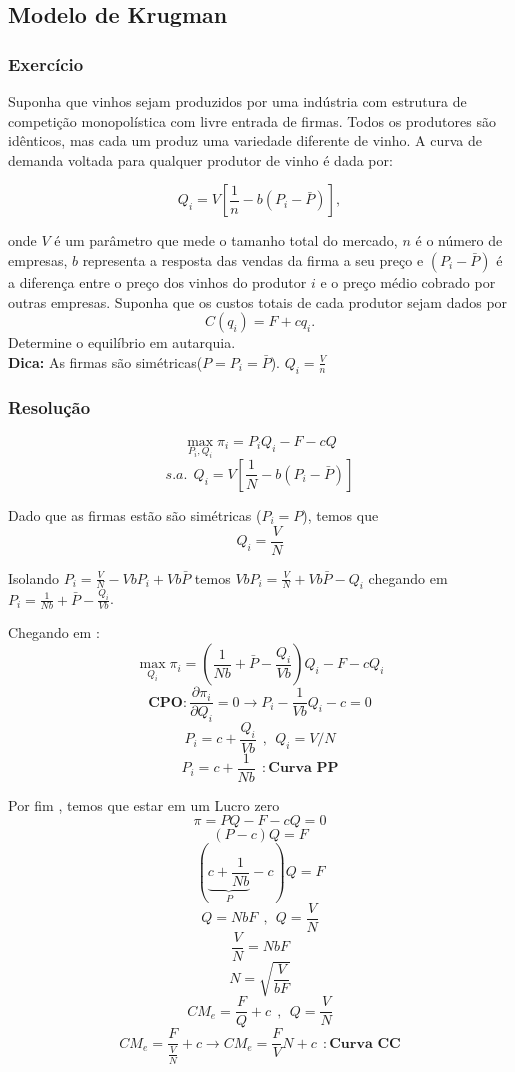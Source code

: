\documentclass[a4paper,12pt]{article}[abntex2]
\begin{document}
\subsection{\textbf{Modelo de Krugman}}
\subsubsection{\textbf{Exercício}}
Suponha que vinhos sejam produzidos por uma indústria com estrutura de  
competição monopolística com livre entrada de firmas. Todos os produtores são  
idênticos, mas cada um produz uma variedade diferente de vinho. A curva de  
demanda voltada para qualquer produtor de vinho é dada por:

\[
Q_i = V \left[ \frac{1}{n} - b(P_i - \bar{P}) \right],
\]

onde \(V\) é um parâmetro que mede o tamanho total do mercado,  
\(n\) é o número de empresas, \(b\) representa a resposta das vendas da firma  
a seu preço e \((P_i - \bar{P})\) é a diferença entre o preço dos vinhos do produtor  
\(i\) e o preço médio cobrado por outras empresas. Suponha que os custos totais  
de cada produtor sejam dados por  
\[
C(q_i) = F + c q_i.
\]  
Determine o equilíbrio em autarquia.\\

\textbf{Dica:} As firmas são simétricas(\(P=P_i=\bar{P}\)).
\(
Q_i=\frac{V}{n}
\)

\subsubsection{\textbf{Resolução}}
\[
\max_{P_i,Q_i}\pi_i=P_iQ_i-F-cQ
\]
\[
s.a. \ \ Q_i=V[\frac{1}{N}-b(P_i-\bar{P})]
\]

Dado que as firmas estão são simétricas (\(P_i=P\)), temos que 
\[
Q_i=\frac{V}{N}
\]

Isolando \(P_i=\frac{V}{N}-VbP_i+Vb\bar{P}\) temos \(VbP_i=\frac{V}{N}+Vb\bar{P}-Q_i\) chegando em \(P_i=\frac{1}{Nb}+\bar{P}-\frac{Q_i}{Vb}\).

Chegando em :
\[
\max_{Q_i} \pi_i=(\frac{1}{Nb}+\bar{P}-\frac{Q_i}{Vb})Q_i-F-cQ_i
\]
\[
\textbf{CPO}: \frac{\partial \pi_i}{\partial Q_i}=0 \rightarrow P_i-\frac{1}{Vb}Q_i-c=0
\]
\[
P_i=c+\frac{Q_i}{Vb} \ \ , \ \ Q_i=V/N
\]
\[
P_i=c+\frac{1}{Nb} \ \ :\textbf{Curva PP}
\]

Por fim , temos que estar em um Lucro zero
\[
\pi = PQ-F-cQ=0
\]
\[
(P-c)Q=F
\]
\[
(\underbrace{c+\frac{1}{Nb}}_{P}-c)Q=F
\]
\[
Q=NbF \ \ , \ \ Q=\frac{V}{N}
\]
\[
\frac{V}{N}=NbF
\]
\[
N=\sqrt{\frac{V}{bF}}
\]
\[
CM_e=\frac{F}{Q}+c \ \ , \ \ Q=\frac{V}{N}
\]
\[
CM_e=\frac{F}{\frac{V}{N}}+c\rightarrow CM_e=\frac{F}{V}N+c \ \ :\textbf{Curva CC}
\]
\end{document}
